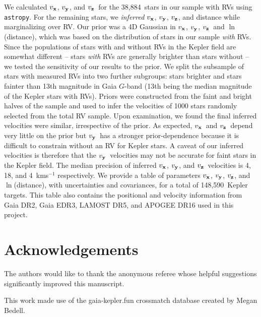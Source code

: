 \documentclass[]{aastex631}
\newcommand{\vx}{$v_{\bf x}$}
\newcommand{\vy}{$v_{\bf y}$}
\newcommand{\vz}{$v_{\bf z}$}
\newcommand{\vxprecision}{4}
\newcommand{\vyprecision}{18}
\newcommand{\vzprecision}{4}
\newcommand{\nstars}{148,590}
\newcommand{\nrv}{38,884}
\begin{document}
We calculated \vx, \vy, and \vz\ for the \nrv\ stars in our sample with RVs
using {\tt astropy}.
For the remaining stars, we {\it inferred} \vx, \vy, \vz, and distance while
marginalizing over RV.
Our prior was a 4D Gaussian in \vx, \vy, \vz\ and $\ln$(distance), which was
based on the distribution of stars in our sample {\it with} RVs.
Since the populations of stars with and without RVs in the Kepler field are
somewhat different -- stars {\it with} RVs are generally brighter than stars
without -- we tested the sensitivity of our results to the prior.
We split the subsample of stars with measured RVs into two further subgroups:
stars brighter and stars fainter than 13th magnitude in Gaia $G$-band (13th
being the median magnitude of the Kepler stars with RVs).
Priors were constructed from the faint and bright halves of the sample and
used to infer the velocities of 1000 stars randomly selected from the total RV
sample.
Upon examination, we found the final inferred velocities were similar,
irrespective of the prior.
As expected, \vx\ and \vz\ depend very little on the prior but \vy\ has a
stronger prior-dependence because it is difficult to constrain without an RV
for Kepler stars.
A caveat of our inferred velocities is therefore that the \vy\ velocities may
not be accurate for faint stars in the Kepler field.
The median precision of inferred \vx, \vy, and \vz\ velocities is
\vxprecision, \vyprecision, and \vzprecision\ kms$^{-1}$ respectively.
We provide a table of parameters \vx, \vy, \vz, and $\ln$(distance), with
uncertainties and covariances, for a total of \nstars\ Kepler targets.
This table also contains the positional and velocity information from Gaia
DR2, Gaia EDR3, LAMOST DR5, and APOGEE DR16 used in this project.


\section*{Acknowledgements}

The authors would like to thank the anonymous referee whose helpful
suggestions significantly improved this manuscript.

This work made use of the gaia-kepler.fun crossmatch database created by Megan
Bedell.
\end{document}
